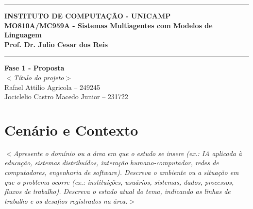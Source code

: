 \documentclass[12pt]{article}
\renewcommand{\headrulewidth}{0pt} %
\begin{document}
\vspace{5mm}
\hrule

\vspace{3mm}

\begin{center}
    {\large\textbf{INSTITUTO DE COMPUTAÇÃO - UNICAMP}} \\
    \vspace{3mm}
    {\large\textbf{MO810A/MC959A - Sistemas Multiagentes com Modelos de Linguagem}} \\
    \vspace{3mm}
    {\large\textbf{Prof. Dr. Julio Cesar dos Reis}}
\end{center}

\vspace{3mm}
\hrule

\vspace{2.5cm}
\begin{flushright}
    \Large{\textbf{Fase 1 - Proposta}} \\
    \vspace{1cm}
    \textit{
        $<$Título do projeto$>$ \\
    }
    \vspace{5cm}
    Rafael Attilio Agricola -- 249245 \\
    Jociclelio Castro Macedo Junior -- 231722
\end{flushright}



\newpage
\pagestyle{fancy} %
\fancyhf{} %
\renewcommand{\headrulewidth}{0pt} %

\fancyfoot[R]{\thepage}



\section{Cenário e Contexto}
\label{sec:contexto}

\textit{$<$Apresente o domínio ou a área em que o estudo se insere (ex.: IA aplicada à educação, sistemas distribuídos, interação humano-computador, redes de computadores, engenharia de software). Descreva o ambiente ou a situação em que o problema ocorre (ex.: instituições, usuários, sistemas, dados, processos, fluxos de trabalho). Descreva o estado atual do tema, indicando as linhas de trabalho e os desafios registrados na área.$>$}
\end{document}
